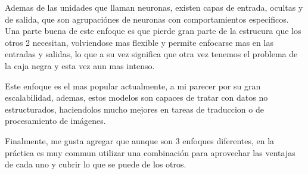 \begin{itemize}
    Ademas de las unidades que llaman neuronas, existen capas de entrada, ocultas y de salida, que son agrupaciónes de neuronas con comportamientos especificos. Una parte buena de este enfoque es que pierde gran parte de la estrucura que los otros 2 necesitan, volviendose mas flexible y permite enfocarse mas en las entradas y salidas, lo que a su vez significa que otra vez tenemos el problema de la caja negra y esta vez aun mas intenso. \vspace{.3cm}

    Este enfoque es el mas popular actualmente, a mi parecer por su gran escalabilidad, ademas, estos modelos son capaces de tratar con datos no estructurados, haciendolos mucho mejores en tareas de traduccion o de procesamiento de imágenes.\vspace{.3cm}

    \cite{goodfellow2016deep}
\end{itemize}

Finalmente, me gusta agregar que aunque son 3 enfoques diferentes, en la práctica es muy commun utilizar una combinación para aprovechar las ventajas de cada uno y cubrir lo que se puede de los otros.